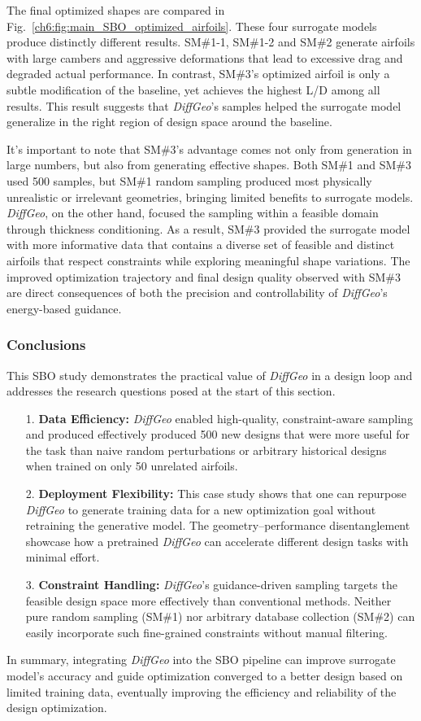 The final optimized shapes are compared in Fig.~\ref{ch6:fig:main_SBO_optimized_airfoils}. These four surrogate models produce distinctly different results. SM\#1-1, SM\#1-2 and SM\#2 generate airfoils with large cambers and aggressive deformations that lead to excessive drag and degraded actual performance. In contrast, SM\#3’s optimized airfoil is only a subtle modification of the baseline, yet achieves the highest L/D among all results. This result suggests that \textit{DiffGeo}’s samples helped the surrogate model generalize in the right region of design space around the baseline. 

It’s important to note that SM\#3’s advantage comes not only from generation in large numbers, but also from generating effective shapes. Both SM\#1 and SM\#3 used 500 samples, but SM\#1 random sampling produced most physically unrealistic or irrelevant geometries, bringing limited benefits to surrogate models. \textit{DiffGeo}, on the other hand, focused the sampling within a feasible domain through thickness conditioning. As a result, SM\#3 provided the surrogate model with more informative data that contains a diverse set of feasible and distinct airfoils that respect constraints while exploring meaningful shape variations. The improved optimization trajectory and final design quality observed with SM\#3 are direct consequences of both the precision and controllability of \textit{DiffGeo}'s energy-based guidance.

\subsubsection{Conclusions}

This SBO study demonstrates the practical value of \textit{DiffGeo} in a design loop and addresses the research questions posed at the start of this section.

\begin{itemize}
    \item[1.] \textbf{Data Efficiency:} \textit{DiffGeo} enabled high-quality, constraint-aware sampling and produced effectively produced 500 new designs that were more useful for the task than naive random perturbations or arbitrary historical designs when trained on only 50 unrelated airfoils.

    \item[2.] \textbf{Deployment Flexibility:} This case study shows that one can repurpose \textit{DiffGeo} to generate training data for a new optimization goal without retraining the generative model. The geometry–performance disentanglement showcase how a pretrained \textit{DiffGeo} can accelerate different design tasks with minimal effort.

    \item[3.] \textbf{Constraint Handling:} \textit{DiffGeo}’s guidance-driven sampling targets the feasible design space more effectively than conventional methods. Neither pure random sampling (SM\#1) nor arbitrary database collection (SM\#2) can easily incorporate such fine-grained constraints without manual filtering.
\end{itemize}

In summary, integrating \textit{DiffGeo} into the SBO pipeline can improve surrogate model's accuracy and guide optimization converged to a better design based on limited training data, eventually improving the efficiency and reliability of the design optimization.